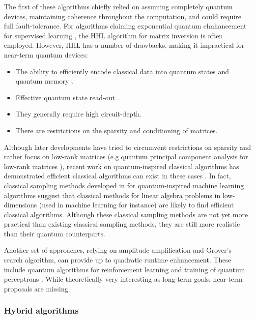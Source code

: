 \documentclass[twocolumn, aps, rmp, amsmath, amssymb, nofootinbib, superscriptaddress, longbibliography, floatfix, table-of-contents, eqsecnum]{revtex4}
\begin{document}
The first of these algorithms chiefly relied on assuming completely quantum devices, maintaining coherence throughout the computation, and could require full fault-tolerance. For algorithms claiming exponential quantum ehnhancement for supervised learning \cite{bib:biamonte2017quantum, bib:ciliberto2018quantum}, the HHL algorithm \cite{bib:harrow2009quantum} for matrix inversion is often employed. However, HHL has a number of drawbacks, making it impractical for near-term quantum devices:
\begin{itemize}
\item The ability to efficiently encode classical data into quantum states and quantum memory \cite{bib:aaronson2015read}.
\item Effective quantum state read-out \cite{bib:aaronson2015read}.
\item They generally require high circuit-depth.
\item There are restrictions on the sparsity and conditioning of matrices.
\end{itemize}

Although later developments have tried to circumvent restrictions on sparsity and rather focus on low-rank matrices (e.g quantum principal component analysis for low-rank matrices \cite{bib:lloyd2014quantum}), recent work on quantum-inspired classical algorithms has demonstrated efficient classical algorithms can exist in these cases \cite{bib:tang2018quantum, bib:gilyen2018quantum, bib:chia2018quantum}. In fact, classical sampling methods developed in \cite{bib:tang2018quantum} for quantum-inspired machine learning algorithms suggest that classical methods for linear algebra problems in low-dimensions (used in machine learning for instance) are likely to find efficient classical algorithms. Although these classical sampling methods are not yet more practical than existing classical sampling methods, they are still more realistic than their quantum counterparts.

Another set of approaches, relying on amplitude amplification and Grover's search algorithm, can provide up to quadratic runtime enhancement. These include quantum algorithms for reinforcement learning \cite{bib:dunjko2016quantum} and training of quantum perceptrons \cite{bib:kapoor2016quantum}. While theoretically very interesting as long-term goals, near-term proposals are missing.

\subsubsection{Hybrid algorithms}
\end{document}
